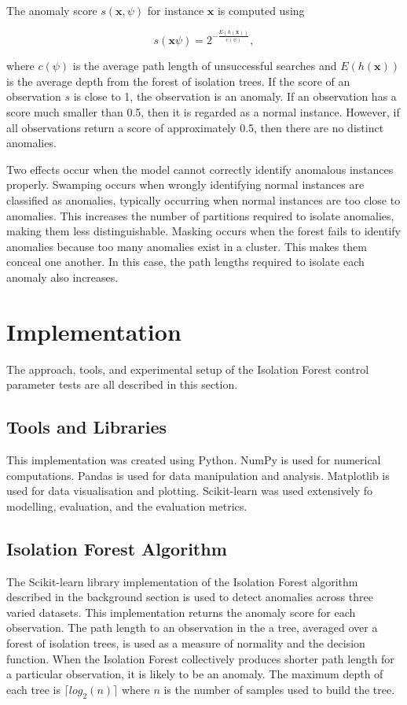 \documentclass[10pt, conference]{IEEEtran}
\begin{document}
The anomaly score $s(\boldsymbol{x}, \psi)$ for instance $\boldsymbol{x}$ is computed using

\begin{equation}
	s(\boldsymbol{x} \psi) = 2^{- \frac{E(h(\boldsymbol{x}))}{c(\psi)}},
\end{equation}

where $c(\psi)$ is the average path length of unsuccessful searches and $E(h(\boldsymbol{x}))$ is the average depth from the forest of isolation trees. If the score of an observation $s$ is close to 1, the observation is an anomaly. If an observation has a score much smaller than 0.5, then it is regarded as a normal instance. However, if all observations return a score of approximately 0.5, then there are no distinct anomalies.

Two effects occur when the model cannot correctly identify anomalous instances properly. Swamping occurs when wrongly identifying normal instances are classified as anomalies, typically occurring when normal instances are too close to anomalies. This increases the number of partitions required to isolate anomalies, making them less distinguishable. Masking occurs when the forest fails to identify anomalies because too many anomalies exist in a cluster. This makes them conceal one another. In this case, the path lengths required to isolate each anomaly also increases.


\section{Implementation}
The approach, tools, and experimental setup of the Isolation Forest control parameter tests are all described in this section.
\subsection{Tools and Libraries}
This implementation was created using Python. NumPy\cite{harris2020array} is used for numerical computations. Pandas\cite{reback2020pandas} is used for data manipulation and analysis. Matplotlib\cite{Hunter:2007} is used for data visualisation and plotting. Scikit-learn\cite{scikit-learn} was used extensively fo modelling, evaluation, and the evaluation metrics.
\subsection{Isolation Forest Algorithm}
The Scikit-learn library \cite{scikit-learn} implementation of the Isolation Forest algorithm described in the background section is used to detect anomalies across three varied datasets. This implementation returns the anomaly score for each observation. The path length to an observation in the a tree, averaged over a forest of isolation trees, is used as a measure of normality and the decision function. When the Isolation Forest collectively produces shorter path length for a particular observation, it is likely to be an anomaly. The maximum depth of each tree is $\lceil log_2(n) \rceil$ where $n$ is the number of samples used to build the tree.
\end{document}

